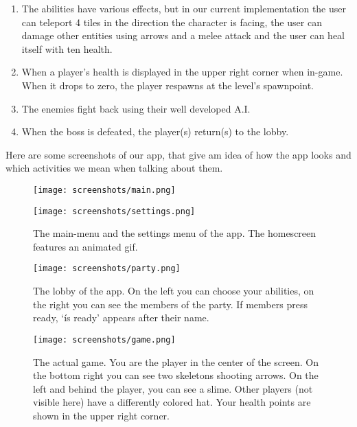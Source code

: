 \documentclass[../main.tex]{subfiles}
\begin{document}
\begin{enumerate}
		\item The abilities have various effects, but in our current implementation the user can teleport 4 tiles in the direction the character is facing, the user can damage other entities using arrows and a melee attack and the user can heal itself with ten health.
		\item When a player's health is displayed in the upper right corner when in-game. When it drops to zero, the player respawns at the level's spawnpoint.		
		\item The enemies fight back using their well developed A.I.
		\item When the boss is defeated, the player(s) return(s) to the lobby.
\end{enumerate}

\noindent
Here are some screenshots of our app, that give am idea of how the app looks and which activities we mean when talking about them. 		
		\begin{figure}[H]
			\centering
			\begin{minipage}{.45\textwidth}
				\centering
				\texttt{[image: screenshots/main.png]}
			\end{minipage}
			\begin{minipage}{.45\textwidth}
				\centering
				\texttt{[image: screenshots/settings.png]}
			\end{minipage}
			\caption{The main-menu and the settings menu of the app. The homescreen features an animated gif.}
		\end{figure}
		
		\begin{figure}[H]
    	\centering
    	\texttt{[image: screenshots/party.png]}
			\caption{The lobby of the app. On the left you can choose your abilities, on the right you can see the members of the party. If members press ready, `ís ready' appears after their name.}
  	\end{figure}
		\begin{figure}[H]
    	\centering
			\texttt{[image: screenshots/game.png]}
			\caption{The actual game. You are the player in the center of the screen. On the bottom right you can see two skeletons shooting arrows. On the left and behind the player, you can see a slime. Other players (not visible here) have a differently colored hat. Your health points are shown in the upper right corner.}
  	\end{figure}
    
\end{document}
